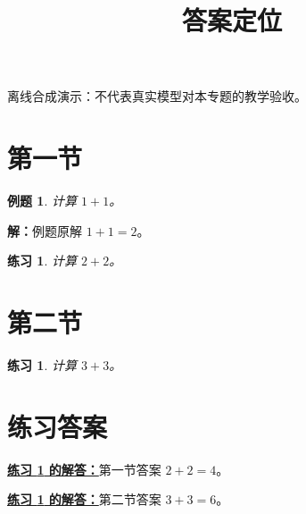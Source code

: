 \documentclass[UTF8,fontset=fandol,11pt]{ctexart}
\title{答案定位}
\date{}
\newtheorem{example}[definition]{例题}
\newtheorem{exercise}[definition]{练习}
\begin{document}
\maketitle
\par\noindent 离线合成演示：不代表真实模型对本专题的教学验收。\par
\section{第一节}\label{sec:S01}
\begin{example}
计算 $1+1$。
\end{example}
\par\noindent\textbf{解：}例题原解 $1+1=2$。\par
\begin{exercise}
\label{mathagent:exercise:d038ac307b6079d71d636e7dfa039fc3fa1e094f72c4fea758a79f0f0081f728}
计算 $2+2$。
\end{exercise}
\section{第二节}\label{sec:S02}
\begin{exercise}
\label{mathagent:exercise:84928b6d72a05fc19d6c10c013040b9e7d1f9cf2265eec91ca520a387ed1049f}
计算 $3+3$。
\end{exercise}
\section*{练习答案}
\par\noindent\textbf{\hyperref[mathagent:exercise:d038ac307b6079d71d636e7dfa039fc3fa1e094f72c4fea758a79f0f0081f728]{练习 \ref*{mathagent:exercise:d038ac307b6079d71d636e7dfa039fc3fa1e094f72c4fea758a79f0f0081f728} 的解答：}}第一节答案 $2+2=4$。\par
\par\noindent\textbf{\hyperref[mathagent:exercise:84928b6d72a05fc19d6c10c013040b9e7d1f9cf2265eec91ca520a387ed1049f]{练习 \ref*{mathagent:exercise:84928b6d72a05fc19d6c10c013040b9e7d1f9cf2265eec91ca520a387ed1049f} 的解答：}}第二节答案 $3+3=6$。\par
\end{document}

